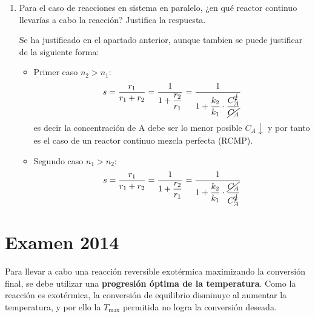 \begin{enumerate}[label={\alph*)}]
\begin{figure}[H]
\begin{subfigure}[b]{0.48\textwidth}
			      \caption{Comparativa de selectividad para $n_1 > n_2$}
		      \end{subfigure}
		      \caption{Selectividad global en función de la conversión para distintas cinéticas}
	      \end{figure}
	\item Para el caso de reacciones en sistema en paralelo, ¿en qué reactor continuo llevarías a cabo la reacción? Justifica la respuesta.

	      Se ha justificado en el apartado anterior, aunque tambien se puede justificar de la siguiente forma:
	      \begin{itemize}
		      \item Primer caso $n_2 > n_1$:
		            \begin{equation*}
			            s = \frac{r_1}{r_1+r_2} =  \frac{1}{1+\dfrac{r_2}{r_1}} = \frac{1}{1+\dfrac{k_2}{k_1}\cdot \dfrac{C_A^{\cancel{2}}}{\cancel{C_A}}}
		            \end{equation*}
		            es decir la concentración de A debe ser lo menor posible $C_A \downarrow$ y por tanto es el caso de un reactor continuo mezcla perfecta (RCMP).
		      \item Segundo caso $n_1 > n_2$:
		            \begin{equation*}
			            s = \frac{r_1}{r_1+r_2} =  \frac{1}{1+\dfrac{r_2}{r_1}} = \frac{1}{1+\dfrac{k_2}{k_1}\cdot \dfrac{\cancel{C_A}}{C_A^{\cancel{2}}}}
		            \end{equation*}
	      \end{itemize}
\end{enumerate}

\newpage
\section{Examen 2014}

\solve{}
Para llevar a cabo una reacción reversible exotérmica maximizando la conversión final, se debe utilizar una \textbf{progresión óptima de la temperatura}. Como la reacción es exotérmica, la conversión de equilibrio disminuye al aumentar la temperatura, y por ello la $T_{\text{max}}$ permitida no logra la conversión deseada.

